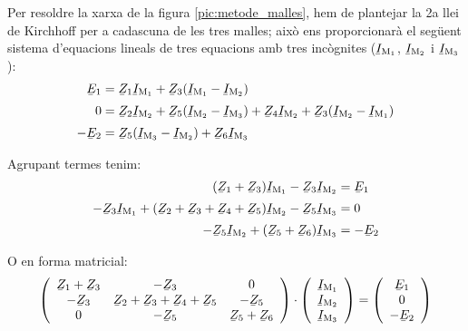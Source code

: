 Per resoldre la xarxa de la figura \vref{pic:metode_malles}, hem de plantejar la 2a llei de Kirchhoff per a cadascuna de les tres malles; això ens proporcionarà el següent sistema d'equacions lineals de tres equacions amb tres incògnites ($\cmplx{I}\ped{M_1}$, $\cmplx{I}\ped{M_2}$ i $\cmplx{I}\ped{M_3}$):
\begin{subequations}
\begin{align}
    \cmplx{E}_1 &= \cmplx{Z}_1 \cmplx{I}\ped{M_1} + \cmplx{Z}_3 (\cmplx{I}\ped{M_1}-\cmplx{I}\ped{M_2}) \\[0.5ex]
    0 &= \cmplx{Z}_2 \cmplx{I}\ped{M_2} + \cmplx{Z}_5(\cmplx{I}\ped{M_2}-\cmplx{I}\ped{M_3}) + \cmplx{Z}_4 \cmplx{I}\ped{M_2} + \cmplx{Z}_3(\cmplx{I}\ped{M_2}-\cmplx{I}\ped{M_1}) \\[0.5ex]
    -\cmplx{E}_2 &=  \cmplx{Z}_5 (\cmplx{I}\ped{M_3}-\cmplx{I}\ped{M_2})+\cmplx{Z}_6 \cmplx{I}\ped{M_3}
\end{align}
\end{subequations}

Agrupant termes tenim:
\begin{subequations}
\begin{align}
    (\cmplx{Z}_1 + \cmplx{Z}_3) \cmplx{I}\ped{M_1} - \cmplx{Z}_3 \cmplx{I}\ped{M_2} &= \cmplx{E}_1 \\[0.5ex]
    -\cmplx{Z}_3 \cmplx{I}\ped{M_1} + (\cmplx{Z}_2 + \cmplx{Z}_3+ \cmplx{Z}_4+ \cmplx{Z}_5)\cmplx{I}\ped{M_2} - \cmplx{Z}_5 \cmplx{I}\ped{M_3} &= 0 \\[0.5ex]
     -\cmplx{Z}_5 \cmplx{I}\ped{M_2} +  (\cmplx{Z}_5 + \cmplx{Z}_6) \cmplx{I}\ped{M_3} &= -\cmplx{E}_2
\end{align}
\end{subequations}

O en forma matricial:
\begin{equation}\label{eq:malles-mat}
  \left(
    \begin{array}{ccc}
      \cmplx{Z}_1 + \cmplx{Z}_3 & -\cmplx{Z}_3 & 0 \\
      -\cmplx{Z}_3 & \cmplx{Z}_2 + \cmplx{Z}_3+ \cmplx{Z}_4+ \cmplx{Z}_5 & -\cmplx{Z}_5 \\
      0 & -\cmplx{Z}_5 & \cmplx{Z}_5 + \cmplx{Z}_6 \\
    \end{array}
  \right)
  \cdot
  \left(
      \begin{array}{c}
        \cmplx{I}\ped{M_1} \\
        \cmplx{I}\ped{M_2} \\
        \cmplx{I}\ped{M_3} \\
      \end{array}
  \right)
  =
  \left(
      \begin{array}{c}
        \cmplx{E}_1 \\
        0 \\
        -\cmplx{E}_2 \\
      \end{array}
  \right)
\end{equation}

